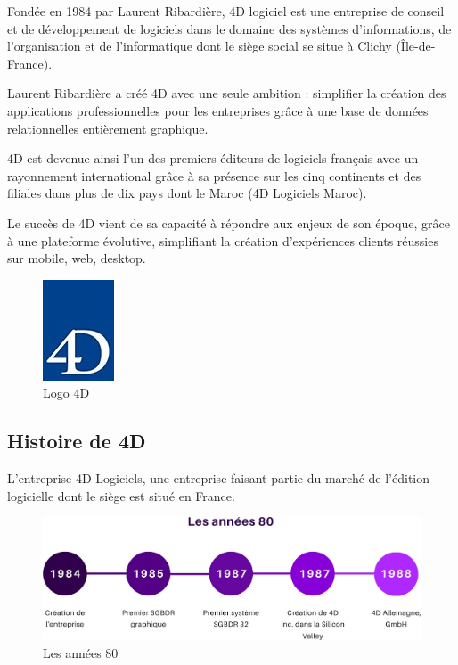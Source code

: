 Fondée en 1984 par Laurent Ribardière, 4D logiciel est une entreprise de conseil et de
développement de logiciels dans le domaine des systèmes d’informations, de l’organisation
et de l’informatique dont le siège social se situe à Clichy (Île-de-France).
\newline

Laurent Ribardière a créé 4D avec une seule ambition : simplifier la création des
applications professionnelles pour les entreprises grâce à une base de données relationnelles
entièrement graphique.
\newline

4D est devenue ainsi l’un des premiers éditeurs de logiciels français avec un rayonnement international grâce à sa présence sur les cinq continents et des filiales dans plus de
dix pays dont le Maroc (4D Logiciels Maroc).
\newline

Le succès de 4D vient de sa capacité à répondre aux enjeux de son époque, grâce à
une plateforme évolutive, simplifiant la création d’expériences clients réussies sur mobile,
web, desktop.


\begin{figure}[h]
    \centering
    \includegraphics[scale=1.5]{Images/logo-4d.jpg} %
    \caption{Logo 4D}
    \label{fig:Logo4D}
\end{figure}




\subsection{Histoire de 4D}

L’entreprise 4D Logiciels, une entreprise faisant partie du marché de l’édition logicielle
dont le siège est situé en France.
\newline
\newline
\newline
\newline


\begin{figure}[h]
    \centering
    \includegraphics[scale=0.3]{Images/80.jpg} %
    \caption{Les années 80}
    \label{fig:Histoire80}
\end{figure}



